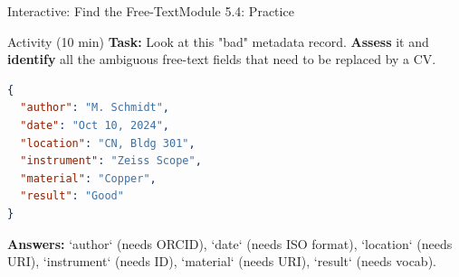 \begin{frame}[fragile]{Interactive: Find the Free-Text}{Module 5.4: Practice}
    \begin{block}{Activity (10 min)}
        \textbf{Task:} Look at this "bad" metadata record. \textbf{Assess} it and \textbf{identify} all the ambiguous free-text fields that need to be replaced by a CV.
\begin{lstlisting}[language=json]
{
  "author": "M. Schmidt",
  "date": "Oct 10, 2024",
  "location": "CN, Bldg 301",
  "instrument": "Zeiss Scope",
  "material": "Copper",
  "result": "Good"
}
\end{lstlisting}
        \pause
        \textbf{Answers:} `author` (needs ORCID), `date` (needs ISO format), `location` (needs URI), `instrument` (needs ID), `material` (needs URI), `result` (needs vocab).
    \end{block}
\end{frame}

